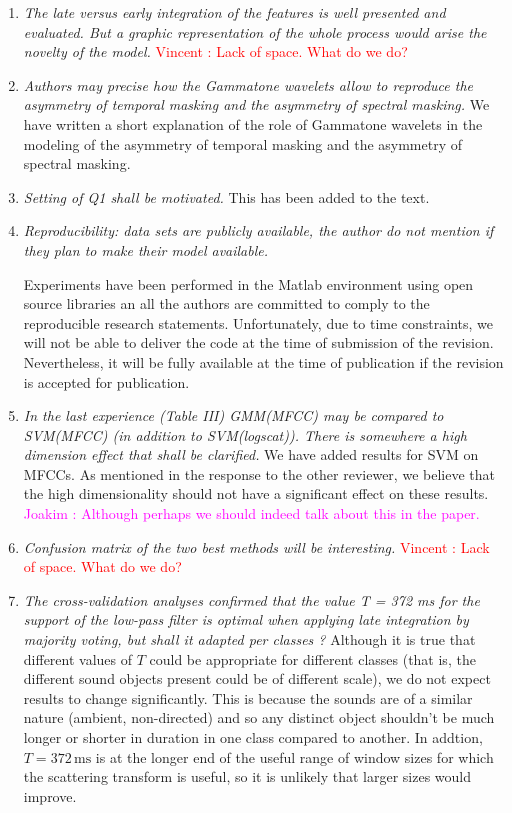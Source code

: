 \documentclass[10pt]{article}
\newcommand{\vl}[1]{\textcolor{red}{Vincent : #1}}
\newcommand{\ja}[1]{\textcolor{magenta}{Joakim : #1}}
\begin{document}
\begin{enumerate}

\item \emph{The late versus early integration of the features is well presented and evaluated. But a graphic representation of the whole process would arise the novelty of the model.}
\vl{Lack of space. What do we do?}

\item \emph{Authors may precise how the Gammatone wavelets allow to reproduce the asymmetry of temporal masking and the asymmetry of spectral masking.}
We have written a short explanation of the role of Gammatone wavelets in the modeling of the asymmetry of temporal masking and the asymmetry of spectral masking.

\item \emph{Setting of Q1 shall be motivated.}
This has been added to the text.

\item \emph{Reproducibility:  data sets are publicly available, the author do not mention if they plan to make their model available.}

Experiments have been performed in the Matlab environment using open source libraries an all the authors are committed to comply to the reproducible research statements. Unfortunately, due to time constraints, we will not be able to deliver the code at the time of submission of the revision. Nevertheless, it will be fully available at the time of publication if the revision is accepted for publication.

\item \emph{In the last experience (Table III) GMM(MFCC) may be compared to SVM(MFCC) (in addition to SVM(logscat)). There is somewhere a high dimension effect that shall be clarified.}
We have added results for SVM on MFCCs. As mentioned in the response to the other reviewer, we believe that the high dimensionality should not have a significant effect on these results. \ja{Although perhaps we should indeed talk about this in the paper.}

\item \emph{Confusion matrix of the two best methods will be interesting.}
\vl{Lack of space. What do we do?}

\item \emph{The cross-validation analyses confirmed that the value T = 372 ms for the support of the low-pass filter is optimal when applying late integration by majority voting, but shall it adapted per classes  ?}
Although it is true that different values of $T$ could be appropriate for different classes (that is, the different sound objects present could be of different scale), we do not expect results to change significantly. This is because the sounds are of a similar nature (ambient, non-directed) and so any distinct object shouldn't be much longer or shorter in duration in one class compared to another. In addtion, $T = 372\,\mathrm{ms}$ is at the longer end of the useful range of window sizes for which the scattering transform is useful, so it is unlikely that larger sizes would improve.


\end{enumerate}
\end{document}

